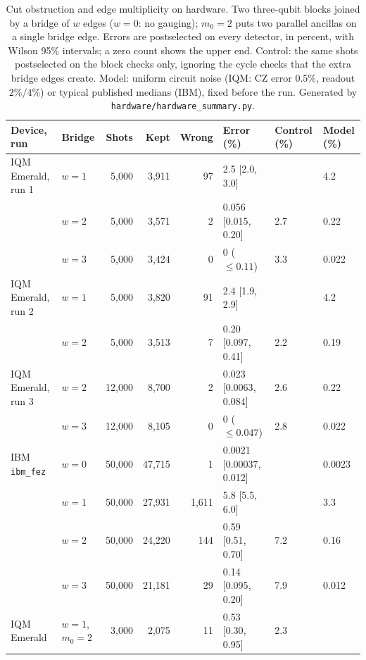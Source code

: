 \begin{table}[t]
\caption{Cut obstruction and edge multiplicity on hardware.  Two three-qubit blocks joined by a bridge of $w$ edges ($w=0$: no gauging); $m_0=2$ puts two parallel ancillas on a single bridge edge.  Errors are postselected on every detector, in percent, with Wilson 95\% intervals; a zero count shows the upper end.  Control: the same shots postselected on the block checks only, ignoring the cycle checks that the extra bridge edges create.  Model: uniform circuit noise (IQM: CZ error $0.5\%$, readout $2\%/4\%$) or typical published medians (IBM), fixed before the run.  Generated by \texttt{hardware/hardware\_summary.py}.}
\label{tab:hardware-cut}
\begin{ruledtabular}
\begin{tabular}{llrrrlll}
Device, run & Bridge & Shots & Kept & Wrong & Error (\%) & Control (\%) & Model (\%)\\
\hline
IQM Emerald{,} run 1 & $w=1$ & 5{,}000 & 3{,}911 & 97 & 2.5 [2.0{,} 3.0] &  & 4.2\\
 & $w=2$ & 5{,}000 & 3{,}571 & 2 & 0.056 [0.015{,} 0.20] & 2.7 & 0.22\\
 & $w=3$ & 5{,}000 & 3{,}424 & 0 & $0$ ($\le0.11$) & 3.3 & 0.022\\
\hline
IQM Emerald{,} run 2 & $w=1$ & 5{,}000 & 3{,}820 & 91 & 2.4 [1.9{,} 2.9] &  & 4.2\\
 & $w=2$ & 5{,}000 & 3{,}513 & 7 & 0.20 [0.097{,} 0.41] & 2.2 & 0.19\\
\hline
IQM Emerald{,} run 3 & $w=2$ & 12{,}000 & 8{,}700 & 2 & 0.023 [0.0063{,} 0.084] & 2.6 & 0.22\\
 & $w=3$ & 12{,}000 & 8{,}105 & 0 & $0$ ($\le0.047$) & 2.8 & 0.022\\
\hline
IBM \texttt{ibm\_fez} & $w=0$ & 50{,}000 & 47{,}715 & 1 & 0.0021 [0.00037{,} 0.012] &  & 0.0023\\
 & $w=1$ & 50{,}000 & 27{,}931 & 1{,}611 & 5.8 [5.5{,} 6.0] &  & 3.3\\
 & $w=2$ & 50{,}000 & 24{,}220 & 144 & 0.59 [0.51{,} 0.70] & 7.2 & 0.16\\
 & $w=3$ & 50{,}000 & 21{,}181 & 29 & 0.14 [0.095{,} 0.20] & 7.9 & 0.012\\
\hline
IQM Emerald & $w=1${,} $m_0=2$ & 3{,}000 & 2{,}075 & 11 & 0.53 [0.30{,} 0.95] & 2.3 & \\
\end{tabular}
\end{ruledtabular}
\end{table}

